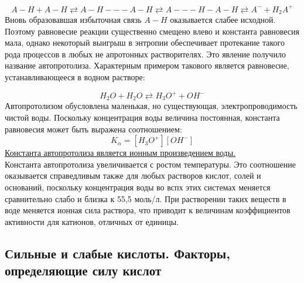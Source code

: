 \documentclass[14pt,a4paper]{scrartcl}
\begin{document}
$$A-H + A-H \rightleftarrows A-H---A-H \rightleftarrows A---H-A-H \rightleftarrows A^- + H_2A^+$$
Вновь образовавшая избыточная связь $A-H$ оказывается слабее исходной. Поэтому  равновесие реакции существенно смещено влево и константа равновесия мала, однако некоторый выигрыш в энтропии обеспечивает протекание такого рода процессов в любых не апротонных растворителях. Это явление получило название автопротолиза. Характерным примером такового является равновесие, устанавливающееся в водном растворе:

$$H_2O + H_2O \rightleftarrows H_3O^+ + OH^-$$
Автопротолизом обусловлена маленькая, но существующая, электропроводимость чистой воды. Поскольку концентрация воды величина постоянная, константа равновесия может быть выражена соотношением: 
$$K_{\alpha} = \left[H_3O^+\right]\left[OH^-\right]$$
\ul{Константа автопротолиза является ионным произведением воды.}\\
Константа автопротолиза увеличивается  с ростом температуры. Это соотношение оказывается справедливым также для любых растворов кислот, солей и оснований, поскольку концентрация воды во вспх этих системах меняется сравнительно слабо и близка к 55,5 моль/л. При растворении таких веществ в воде меняется ионная сила раствора, что приводит к величинам коэффициентов активности для катионов, отличных от единицы.

\subsection*{Сильные и слабые кислоты. Факторы, определяющие силу кислот}
\end{document}
